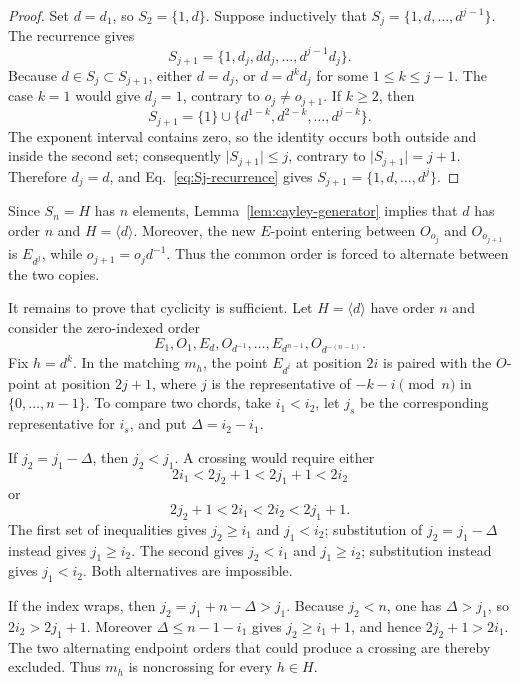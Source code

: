 \documentclass[11pt]{article}
\theoremstyle{definition}
\theoremstyle{remark}
\numberwithin{equation}{section}
\begin{document}
\begin{proof}
Set \(d=d_1\), so \(S_2=\{1,d\}\).  Suppose inductively that
\(S_j=\{1,d,\ldots,d^{j-1}\}\).  The recurrence gives
\[
  S_{j+1}
  =
  \{1,d_j,dd_j,\ldots,d^{j-1}d_j\}.
\]
Because \(d\in S_j\subset S_{j+1}\), either \(d=d_j\), or
\(d=d^k d_j\) for some \(1\leq k\leq j-1\).  The case \(k=1\) would give
\(d_j=1\), contrary to \(o_j\ne o_{j+1}\).  If \(k\geq2\), then
\[
  S_{j+1}
  =
  \{1\}\cup\{d^{1-k},d^{2-k},\ldots,d^{j-k}\}.
\]
The exponent interval contains zero, so the identity occurs both outside and
inside the second set; consequently \(\lvert S_{j+1}\rvert\leq j\), contrary
to \(\lvert S_{j+1}\rvert=j+1\).  Therefore \(d_j=d\), and
Eq.~\eqref{eq:Sj-recurrence} gives
\(S_{j+1}=\{1,d,\ldots,d^j\}\).
\end{proof}

Since \(S_n=H\) has \(n\) elements, Lemma~\ref{lem:cayley-generator}
implies that \(d\) has order \(n\) and \(H=\langle d\rangle\).  Moreover,
the new \(E\)-point entering between \(O_{o_j}\) and \(O_{o_{j+1}}\) is
\(E_{d^j}\), while \(o_{j+1}=o_jd^{-1}\).  Thus the common order is forced
to alternate between the two copies.

It remains to prove that cyclicity is sufficient.  Let
\(H=\langle d\rangle\) have order \(n\) and consider the
zero-indexed order
\begin{equation}\label{eq:zigzag}
  E_1,O_1,E_d,O_{d^{-1}},\ldots,
  E_{d^{n-1}},O_{d^{-(n-1)}}.
\end{equation}
Fix \(h=d^k\).  In the matching \(m_h\), the point \(E_{d^i}\) at position
\(2i\) is paired with the \(O\)-point at position \(2j+1\), where \(j\) is
the representative of \(-k-i\pmod n\) in \(\{0,\ldots,n-1\}\).  To compare
two chords, take \(i_1<i_2\), let \(j_s\) be the corresponding representative
for \(i_s\), and put \(\Delta=i_2-i_1\).

If \(j_2=j_1-\Delta\), then \(j_2<j_1\).  A crossing would require either
\[
  2i_1<2j_2+1<2j_1+1<2i_2
\]
or
\[
  2j_2+1<2i_1<2i_2<2j_1+1.
\]
The first set of inequalities gives \(j_2\geq i_1\) and \(j_1<i_2\);
substitution of \(j_2=j_1-\Delta\) instead gives \(j_1\geq i_2\).
The second gives \(j_2<i_1\) and \(j_1\geq i_2\); substitution instead
gives \(j_1<i_2\).  Both alternatives are impossible.

If the index wraps, then \(j_2=j_1+n-\Delta>j_1\).  Because
\(j_2<n\), one has \(\Delta>j_1\), so \(2i_2>2j_1+1\).
Moreover \(\Delta\leq n-1-i_1\) gives \(j_2\geq i_1+1\), and hence
\(2j_2+1>2i_1\).  The two alternating endpoint orders that could produce a
crossing are thereby excluded.  Thus \(m_h\) is noncrossing for every
\(h\in H\).
\end{document}
